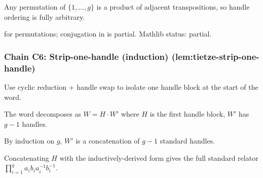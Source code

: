 \begin{lemma}
\label{lem:ths-r4}
Any permutation of $\{1, \ldots, g\}$ is a product of adjacent transpositions, so handle ordering is fully arbitrary.
\leanok
\end{lemma}

\begin{lemma}
\label{lem:ths-r5}
 for permutations; conjugation in  is partial.  Mathlib status: partial.
\leanok
\end{lemma}

\subsubsection*{Chain C6: Strip-one-handle (induction) (lem:tietze-strip-one-handle)}

\begin{lemma}
\label{lem:tsh-r1}
Use cyclic reduction + handle swap to isolate one handle block at the start of the word.
\leanok
\end{lemma}

\begin{lemma}
\label{lem:tsh-r2}
The word decomposes as $W = H \cdot W'$ where $H$ is the first handle block, $W'$ has $g-1$ handles.
\leanok
\end{lemma}

\begin{lemma}
\label{lem:tsh-r3}
By induction on $g$, $W'$ is a concatenation of $g-1$ standard handles.
\leanok
\end{lemma}

\begin{lemma}
\label{lem:tsh-r4}
Concatenating $H$ with the inductively-derived form gives the full standard relator $\prod_{i=1}^{g} a_{i}b_{i}a_{i}^{-1}b_{i}^{-1}$.
\leanok
\end{lemma}

